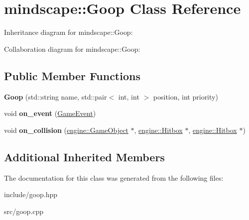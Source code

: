 \hypertarget{classmindscape_1_1_goop}{}\section{mindscape\+:\+:Goop Class Reference}
\label{classmindscape_1_1_goop}


Inheritance diagram for mindscape\+:\+:Goop\+:


Collaboration diagram for mindscape\+:\+:Goop\+:
\subsection*{Public Member Functions}
\begin{DoxyCompactItemize}
\item 
{\bfseries Goop} (std\+::string name, std\+::pair$<$ int, int $>$ position, int priority)\hypertarget{classmindscape_1_1_goop_a2875ad29c31b4f038c91048c2599630a}{}\label{classmindscape_1_1_goop_a2875ad29c31b4f038c91048c2599630a}

\item 
void {\bfseries on\+\_\+event} (\hyperlink{class_game_event}{Game\+Event})\hypertarget{classmindscape_1_1_goop_af4f468308a49c1055063dede23688eaf}{}\label{classmindscape_1_1_goop_af4f468308a49c1055063dede23688eaf}

\item 
void {\bfseries on\+\_\+collision} (\hyperlink{classengine_1_1_game_object}{engine\+::\+Game\+Object} $\ast$, \hyperlink{classengine_1_1_hitbox}{engine\+::\+Hitbox} $\ast$, \hyperlink{classengine_1_1_hitbox}{engine\+::\+Hitbox} $\ast$)\hypertarget{classmindscape_1_1_goop_ad3c2ddd5849565484fa4ffeaf3fd8e42}{}\label{classmindscape_1_1_goop_ad3c2ddd5849565484fa4ffeaf3fd8e42}

\end{DoxyCompactItemize}
\subsection*{Additional Inherited Members}


The documentation for this class was generated from the following files\+:\begin{DoxyCompactItemize}
\item 
include/goop.\+hpp\item 
src/goop.\+cpp\end{DoxyCompactItemize}

